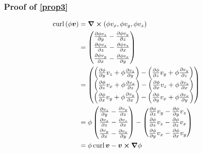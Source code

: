 \documentclass{article}
\renewcommand{\vec}[1]{\boldsymbol{#1}}
\begin{document}
\subsubsection{Proof of \eqref{prop3}}

\begin{align*}
    \text{curl}\left(\phi \vec{v}\right) &= \curl \left( \phi v_x , \phi v_y , \phi v_z \right) \\
    &= \begin{pmatrix} \frac{\partial{ \phi v_z }}{\partial{ y }} - \frac{\partial{ \phi v_y }}{\partial{ z }} \\[0.3em] \frac{\partial{ \phi v_x }}{\partial{ z }} - \frac{\partial{ \phi v_z }}{\partial{ x }} \\[0.3em] \frac{\partial{ \phi v_y }}{\partial{ x }} - \frac{\partial{ \phi v_x }}{\partial{ y }} \end{pmatrix} \\
    &= \begin{pmatrix} \left( \frac{\partial{ \phi }}{\partial{ y }} v_z + \phi \frac{\partial{ v_z }}{\partial{ y }} \right) - \left( \frac{\partial{ \phi }}{\partial{ z }} v_y + \phi \frac{\partial{ v_y }}{\partial{ z }} \right) \\ \left( \frac{\partial{ \phi }}{\partial{ z }} v_x + \phi \frac{\partial{ v_x }}{\partial{ z }} \right) - \left( \frac{\partial{ \phi }}{\partial{ x }} v_z + \phi \frac{\partial{ v_z }}{\partial{ x }} \right) \\ \left( \frac{\partial{ \phi }}{\partial{ x }} v_y + \phi \frac{\partial{ v_y }}{\partial{ x }} \right) - \left( \frac{\partial{ \phi }}{\partial{ y }} v_x + \phi \frac{\partial{ v_x }}{\partial{ y }} \right) \end{pmatrix} \\
    &= \phi \begin{pmatrix} \frac{\partial{ v_z }}{\partial{ y }} - \frac{\partial{ v_y }}{\partial{ z }} \\[0.3em] \frac{\partial{ v_x }}{\partial{ z }} - \frac{\partial{ v_z }}{\partial{ x }} \\[0.3em] \frac{\partial{ v_y }}{\partial{ x }} - \frac{\partial{ v_x }}{\partial{ y }} \end{pmatrix} - \begin{pmatrix} \frac{\partial{ \phi }}{\partial{ z }} v_y - \frac{\partial{ \phi }}{\partial{ y }} v_z \\[0.3em] \frac{\partial{ \phi }}{\partial{ x }} v_z - \frac{\partial{ \phi }}{\partial{ z }} v_x \\[0.3em] \frac{\partial{ \phi }}{\partial{ y }} v_x - \frac{\partial{ \phi }}{\partial{ x }} v_y \end{pmatrix} \\
    &= \phi \, \text{curl} \, \vec{v} - \vec{v} \cross \grad{\phi}
\end{align*}
\end{document}
